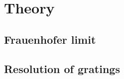 \section{Theory}
\subsection{Frauenhofer limit}
\label{sec:Frauenhofer} %

\subsection{Resolution of gratings}
\label{sec:resolution}
